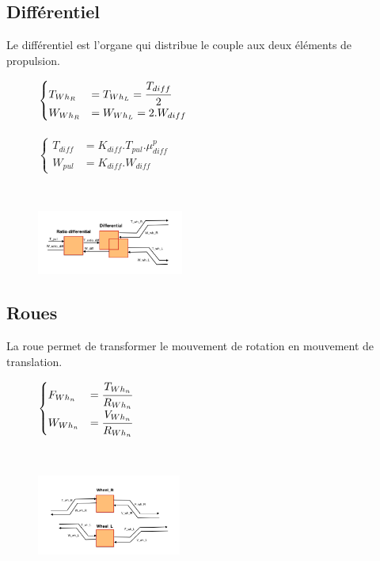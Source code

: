 \subsection{Différentiel}
Le différentiel est l'organe qui distribue le couple aux deux éléments de propulsion.
\vspace{-0px}
\begin{figure}[ht]
\centering
\begin{minipage}{.5\textwidth}  
\centering
$\begin{cases}
	T_{Wh_R} &= T_{Wh_L} = \cfrac{T_{diff}}{2} \\
	W_{Wh_R} &= W_{Wh_L} = 2.W_{diff}
\end{cases}$\\
~\\
$\begin{cases}
	 T_{diff} &= K_{diff}.T_{pul}.\mu{}_{diff}^{p}\\
	W_{pul} &= K_{diff}.W_{diff}
\end{cases}$
\end{minipage}~
\begin{minipage}{.5\textwidth}
  \centering
\includegraphics[height=80px]{images/Differential.png}
\end{minipage}
\end{figure}
\FloatBarrier
\vspace{-10px}

\subsection{Roues}
La roue permet de transformer le mouvement de rotation en mouvement de translation.
\vspace{-10px}
\begin{figure}[ht]
\centering
\begin{minipage}{.5\textwidth}  
\centering
$\begin{cases}
	F_{Wh_n} &= \cfrac{T_{Wh_n}}{R_{Wh_n}}  \\
	W_{Wh_n} &= \cfrac{V_{Wh_n}}{R_{Wh_n}}
\end{cases}$
\end{minipage}~
\begin{minipage}{.5\textwidth}
  \centering
\includegraphics[height=100px]{images/Wheel.png}
\end{minipage}
\end{figure}
\FloatBarrier
\vspace{-30px}

